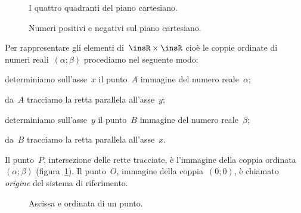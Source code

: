 \begin{figure}[hbt]
 \begin{minipage}[t]{.45\textwidth}
 \centering
 \caption{I quattro quadranti del piano cartesiano.}\label{fig:8.6}
 \end{minipage}\hfil
 \begin{minipage}[t]{.45\textwidth}
 \centering
 \caption{Numeri positivi e negativi sul piano cartesiano.}\label{fig:8.7}
 \end{minipage}
\end{figure}

Per rappresentare gli elementi di~$\insR\times \insR$ cioè le coppie ordinate di numeri reali~$(\alpha; \beta)$ procediamo nel seguente modo:
\begin{itemize*}
\item determiniamo sull'asse~$x$ il punto~$A$ immagine del numero reale~$\alpha$;
\item da~$A$ tracciamo la retta parallela all'asse~$y$;
\item determiniamo sull'asse~$y$ il punto~$B$ immagine del numero reale~$\beta$;
\item da~$B$ tracciamo la retta parallela all'asse~$x$.
\end{itemize*}
Il punto~$P$, intersezione delle rette tracciate, è l'immagine della coppia ordinata~$(\alpha; \beta)$ (figura~\ref{fig:8.7}).  Il punto~$O$, immagine della coppia~$(0;0)$, è chiamato \emph{origine} del sistema di riferimento.

\begin{figure}[bt]
 \begin{minipage}[t]{.3\textwidth}
 \centering
 \caption{}\label{fig:8.8}
 \end{minipage}\hfil
 \begin{minipage}[t]{.45\textwidth}
 \centering
 \caption{}\label{fig:8.9}
 \end{minipage}\hfil
 \begin{minipage}[t]{.25\textwidth}
 \centering
 \caption{Ascissa e ordinata di un punto.}\label{fig:8.10}
\end{minipage}
 \end{figure}


